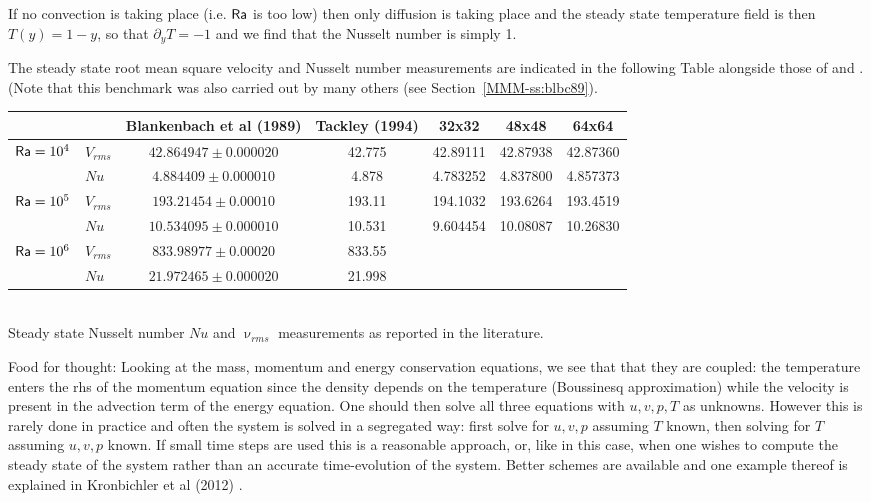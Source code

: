If no convection is taking place (i.e. ${\mathsf{Ra}}$ is too low) then only diffusion is taking place 
and the steady state temperature field is then $T(y)=1-y$, so that $\partial_y T=-1$ and 
we find that the Nusselt number is simply 1.

The steady state root mean square velocity and Nusselt number measurements
are indicated in the following Table alongside those of \cite{blbc89} and \cite{tack94}.
(Note that this benchmark was also carried out by many others (see Section~\ref{MMM-ss:blbc89}).

\begin{center}
\begin{tabular}{llccccc}
\hline
          &           & Blankenbach et al (1989) & Tackley (1994)  & 32x32 & 48x48 & 64x64  \\
\hline
\hline
${\mathsf{Ra}}=10^4$ & $V_{rms}$ &  $42.864947  \pm 0.000020$ & 42.775 & 42.89111& 42.87938& 42.87360\\  
          & $Nu$      &  $4.884409   \pm 0.000010$ & 4.878  & 4.783252 & 4.837800& 4.857373\\
${\mathsf{Ra}}=10^5$ & $V_{rms}$ &  $193.21454  \pm 0.00010 $ & 193.11 & 194.1032 & 193.6264 &  193.4519  \\ 
          & $Nu$      &  $10.534095  \pm 0.000010$ & 10.531 & 9.604454& 10.08087 &  10.26830  \\
${\mathsf{Ra}}=10^6$ & $V_{rms}$ &  $833.98977  \pm 0.00020 $ & 833.55 & & & \\
          & $Nu$      &  $21.972465  \pm 0.000020$ & 21.998 & & & \\
\hline
\end{tabular}\\
{\small Steady state Nusselt number $Nu$ and $\upnu_{rms}$ measurements as reported in the literature. }
\end{center}

Food for thought: Looking at the mass, momentum and energy conservation equations, 
we see that that they are coupled: the temperature enters the rhs of the momentum 
equation since the density depends on the temperature (Boussinesq approximation)
while the velocity is present in the advection term of the energy equation.
One should then solve all three equations with $u,v,p,T$ as unknowns. However
this is rarely done in practice and often the system is solved in a segregated way:
first solve for $u,v,p$ assuming $T$ known, then solving for $T$ assuming $u,v,p$ known.
If small time steps are used this is a reasonable approach, or, like in this case, when 
one wishes to compute the steady state of the system rather than an accurate time-evolution
of the system. Better schemes are available and one example thereof is explained in Kronbichler et al (2012) 
\cite{krhb12}.

